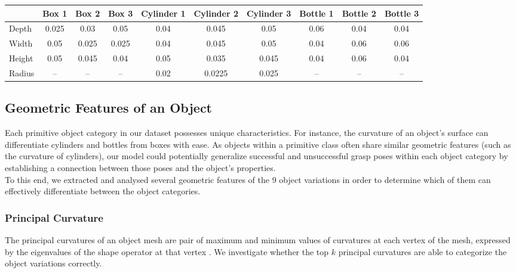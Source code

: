 \documentclass[11pt, a4paper]{report}
\begin{document}
\begin{table}[H]
{\begin{tabular}{lccccccccc}
            & Box 1 & Box 2 & Box 3 & Cylinder 1 & Cylinder 2 & Cylinder 3 & Bottle 1 & Bottle 2 & Bottle 3 \\
            \midrule
            Depth  & 0.025 & 0.03  & 0.05  & 0.04 & 0.045  & 0.05  & 0.06 & 0.04 & 0.04 \\
            Width  & 0.05  & 0.025 & 0.025 & 0.04 & 0.045  & 0.05  & 0.04 & 0.06 & 0.06 \\
            Height & 0.05  & 0.045 & 0.04  & 0.05 & 0.035  & 0.045 & 0.04 & 0.06 & 0.04 \\
            Radius & --    & --    & --    & 0.02 & 0.0225 & 0.025 & --   & --   & --   \\
            \bottomrule
        \end{tabular}
    }
    \label{tbl:5.1}
\end{table}


\subsection{Geometric Features of an Object}
\label{sec:5.2.2}
Each primitive object category in our dataset possesses unique characteristics. For instance, the curvature of an object's surface can differentiate cylinders and bottles from boxes with ease. As objects within a primitive class often share similar geometric features (such as the curvature of cylinders), our model could potentially generalize successful and unsuccessful grasp poses within each object category by establishing a connection between those poses and the object's properties.\\

To this end, we extracted and analysed several geometric features of the 9 object variations in order to determine which of them can effectively differentiate between the object categories.


\subsubsection{Principal Curvature}
\label{sec:5.2.3.1}
The principal curvatures of an object mesh are pair of maximum and minimum values of curvatures at each vertex of the mesh, expressed by the eigenvalues of the shape operator at that vertex \cite{enwiki:1141654906}. We investigate whether the top $k$ principal curvatures are able to categorize the object variations correctly.
\end{document}
